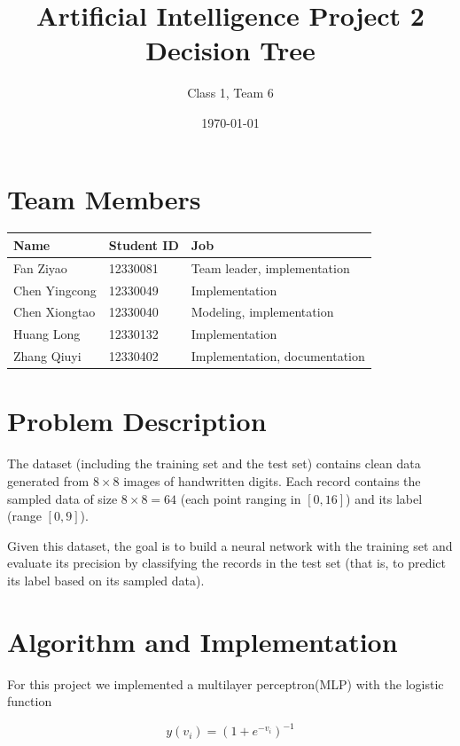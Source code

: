 \documentclass{article}
\begin{document}
\title{
Artificial Intelligence Project 2 \\
Decision Tree
}
\author{Class 1, Team 6}
\date{\today}
\maketitle
\tableofcontents

\section{Team Members}

\begin{table}[H]
\centering
\begin{tabular}{l l l}
Name & Student ID  & Job\\
\hline
Fan Ziyao & 12330081 & Team leader, implementation\\
Chen Yingcong & 12330049 & Implementation \\
Chen Xiongtao & 12330040 & Modeling, implementation \\
Huang Long & 12330132 & Implementation \\
Zhang Qiuyi & 12330402 & Implementation, documentation

\end{tabular}
\end{table}

\section{Problem Description}

The dataset (including the training set and the test set) contains clean data generated from $8 \times 8$ images of handwritten digits. Each record contains the sampled data of size $8 \times 8 = 64$ (each point ranging in $[0, 16]$) and its label (range $[0, 9]$).

Given this dataset, the goal is to build a neural network with the training set and evaluate its precision by classifying the records in the test set (that is, to predict its label based on its sampled data).

\section{Algorithm and Implementation}

For this project we implemented a multilayer perceptron(MLP) with the logistic function

$$y(v_i) = (1+e^{-v_i})^{-1}$$
\end{document}
